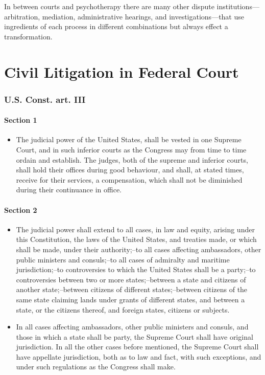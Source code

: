 \documentclass[11pt,letterpaper,twoside]{article}
\providecommand{\tightlist}{%
\setlength{\itemsep}{0em}\setlength{\parskip}{0em}\setlength{\itemindent}{0em}}
\begin{document}
In between courts and psychotherapy there are many other dispute
institutions---arbitration, mediation, administrative hearings, and
investigations---that use ingredients of each process in different
combinations but always effect a transformation.

\section{Civil Litigation in Federal
Court}\label{civil-litigation-in-federal-court}

\subsubsection{U.S. Const. art. III}\label{usconst_art.iii}

\paragraph{Section 1}\label{section-1-1}

\begin{itemize}
\tightlist
\item
  The judicial power of the United States, shall be vested in one
  Supreme Court, and in such inferior courts as the Congress may from
  time to time ordain and establish. The judges, both of the supreme and
  inferior courts, shall hold their offices during good behaviour, and
  shall, at stated times, receive for their services, a compensation,
  which shall not be diminished during their continuance in office.
\end{itemize}

\paragraph{Section 2}\label{section-2-1}

\begin{itemize}
\tightlist
\item
  The judicial power shall extend to all cases, in law and equity,
  arising under this Constitution, the laws of the United States, and
  treaties made, or which shall be made, under their authority;--to all
  cases affecting ambassadors, other public ministers and consuls;--to
  all cases of admiralty and maritime jurisdiction;--to controversies to
  which the United States shall be a party;--to controversies between
  two or more states;--between a state and citizens of another
  state;--between citizens of different states;--between citizens of the
  same state claiming lands under grants of different states, and
  between a state, or the citizens thereof, and foreign states, citizens
  or subjects.
\item
  In all cases affecting ambassadors, other public ministers and
  consuls, and those in which a state shall be party, the Supreme Court
  shall have original jurisdiction. In all the other cases before
  mentioned, the Supreme Court shall have appellate jurisdiction, both
  as to law and fact, with such exceptions, and under such regulations
  as the Congress shall make.
\end{itemize}
\end{document}

